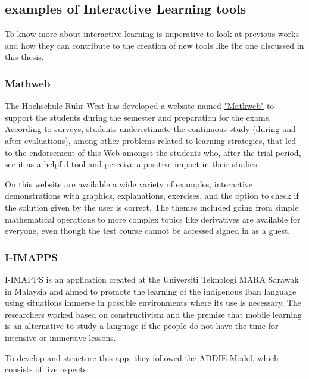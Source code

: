 \subsection{examples of Interactive Learning tools}
To know more about interactive learning is imperative to look at previous works and how they can contribute to the creation of new tools like the one discussed in this thesis.

\subsubsection{Mathweb}
The Hochschule Ruhr West has developed a website named \href{https://mathweb.de/}{"Mathweb"}   to support the students during the semester and preparation for the exams. According to surveys,  students underestimate the continuous study (during and after evaluations), among other problems related to learning strategies, that led to the endorsement of this Web amongst the students who, after the trial period, see it as a helpful tool and perceive a positive impact in their studies \cite{MathWeb}.

On this website are available a wide variety of examples, interactive demonstrations with graphics, explanations, exercises, and the option to check if the solution given by the user is correct. The themes included going from simple mathematical operations to more complex topics like derivatives are available for everyone, even though the test course cannot be accessed signed in as a guest.

\subsubsection{I-IMAPPS}

I-IMAPPS is an application created at the Universiti Teknologi MARA Sarawak in Malaysia and aimed to promote the learning of the indigenous Iban language using situations immerse in possible environments where its use is necessary. The researchers worked based on constructivism and the premise that mobile learning is an alternative to study a language if the people do not have the time for intensive or immersive lessons. 


To develop and structure this app, they followed the ADDIE Model, which consists of five aspects: 

